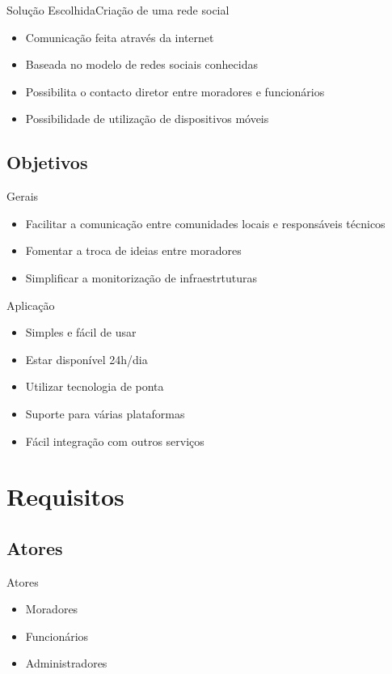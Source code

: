 \documentclass[portuges]{beamer}
\begin{document}
\begin{frame}{Solução Escolhida}{Criação de uma rede social}
  \begin{itemize}
  \item Comunicação feita através da internet
  \item Baseada no modelo de redes sociais conhecidas
  \item Possibilita o contacto diretor entre moradores e funcionários
  \item Possibilidade de utilização de dispositivos móveis
  \end{itemize}
\end{frame}

\subsection{Objetivos}

\begin{frame}{Gerais}
 \begin{itemize}
 \item Facilitar a comunicação entre comunidades locais e responsáveis técnicos
 \item Fomentar a troca de ideias entre moradores
 \item Simplificar a monitorização de infraestrtuturas
 \end{itemize}
\end{frame}

\begin{frame}{Aplicação}
 \begin{itemize}
 \item Simples e fácil de usar
 \item Estar disponível 24h/dia
 \item Utilizar tecnologia de ponta
 \item Suporte para várias plataformas
 \item Fácil integração com outros serviços 
 \end{itemize}
\end{frame}

\section{Requisitos}

\subsection{Atores}

\begin{frame}{Atores}
 \begin{itemize}
 \item Moradores
 \item Funcionários
 \item Administradores
 \end{itemize}
\end{frame}
\end{document}
